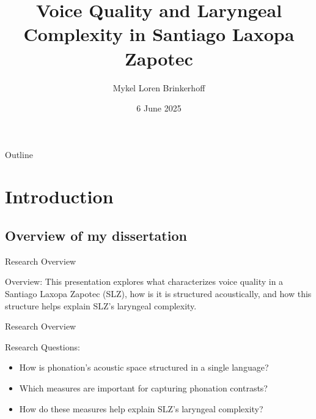 \documentclass[professionalfont]{beamer}
\title[Voice Quality in SLZ] %
{Voice Quality and Laryngeal Complexity in Santiago Laxopa Zapotec}
\author[Brinkerhoff] %
{Mykel Loren Brinkerhoff}
\institute[UC Santa Cruz] %
{University of California, Santa Cruz}
\date[2025-06-06] %
{6 June 2025}
\begin{document}
\begin{frame}
  \titlepage
\end{frame}

\begin{frame}{Outline}
  \tableofcontents
\end{frame}




\section{Introduction}
\subsection{Overview of my dissertation}

\begin{frame}{Research Overview}
  \begin{block}{Overview:}
    This presentation explores what characterizes voice quality in a Santiago Laxopa Zapotec (SLZ), how is it is structured acoustically, and how this structure helps explain SLZ's laryngeal complexity.  
  \end{block}
\end{frame}

\begin{frame}{Research Overview}
  \begin{block}{Research Questions:}
    \begin{itemize}
      \item How is phonation's acoustic space structured in a single language?
      \item Which measures are important for capturing phonation contrasts?
      \item How do these measures help explain SLZ's laryngeal complexity?
    \end{itemize}
  \end{block}
\end{frame}
\end{document}
